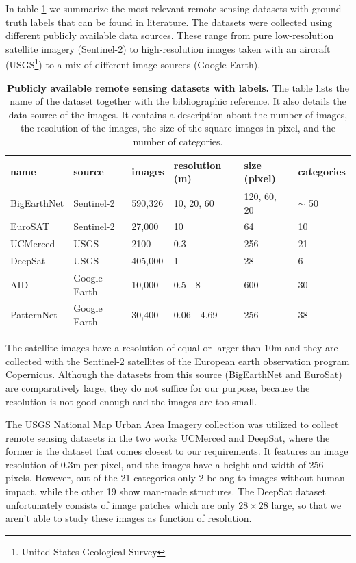 In table \ref{table:datasets} we summarize the most relevant remote sensing datasets with ground truth labels that can be found in literature. The datasets were collected using different publicly available data sources. These range from pure low-resolution satellite imagery (Sentinel-2) to high-resolution images taken with an aircraft (USGS\footnote{United States Geological Survey}) to a mix of different image sources (Google Earth). 

\begin{table}[h!]
	\begin{tabular}{l | l | l | l | l | l }
	name & source & images & resolution (m) & size (pixel) & categories \\
	\hline
	BigEarthNet \parencite{sumbul2019} & Sentinel-2 & 590,326 & 10, 20, 60 & 120, 60, 20 & $\sim$ 50 \\
	EuroSAT \parencite{helber2017}	& Sentinel-2 & 27,000  & 10 & 64  & 10 \\
	UCMerced \parencite{yang2010} & USGS & 2100 & 0.3 & 256 & 21 \\
	DeepSat \parencite{basu2015}  & USGS  & 405,000 & 1 & 28 & 6  \\
	AID \parencite{xia2016} & Google Earth & 10,000  & 0.5 - 8  & 600 & 30 \\
	PatternNet \parencite{zhou2017} & Google Earth & 30,400 & 0.06 - 4.69 & 256 & 38 \\
	\end{tabular}
	\captionsetup{width=1\linewidth}
	\caption{\textbf{Publicly available remote sensing datasets with labels.} The table  lists the name of the dataset together with the bibliographic reference. It also details the data source of the images. It contains a description about the number of images, the resolution of the images, the size of the square images in pixel, and the number of categories.}
	\label{table:datasets}	
\end{table}

The satellite images have a resolution of equal or larger than 10m and they are collected with the Sentinel-2 satellites of the European earth observation program Copernicus. Although the datasets from this source (BigEarthNet and EuroSat) are comparatively large, they do not suffice for our purpose, because the resolution is not good enough and the images are too small.

The USGS National Map Urban Area Imagery collection \parencite{usgs} was utilized to collect remote sensing datasets in the two works UCMerced and DeepSat, where the former is the dataset that comes closest to our requirements. It features an image resolution of 0.3m per pixel, and the images have a height and width of 256 pixels. However, out of the 21 categories only 2 belong to images without human impact, while the other 19 show man-made structures. The DeepSat dataset unfortunately consists of image patches which are only $28 \times 28$ large, so that we aren't able to study these images as function of resolution.


